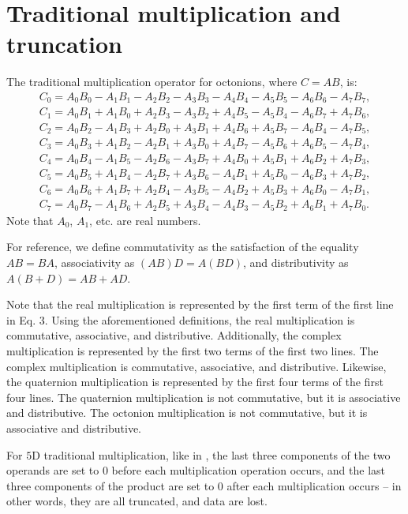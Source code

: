 \documentclass[12pt]{article}
\begin{document}
\section{Traditional multiplication and truncation}

The traditional multiplication operator for octonions, where $C = AB$, is:
\begin{equation}
\begin{split}
C_0 = A_0 B_0 - A_1 B_1 - A_2 B_2 - A_3 B_3 - A_4 B_4 - A_5 B_5 - A_6 B_6 - A_7 B_7, \\
C_1 = A_0 B_1 + A_1 B_0 + A_2 B_3 - A_3 B_2 + A_4 B_5 - A_5 B_4 - A_6 B_7 + A_7 B_6, \\
C_2 = A_0 B_2 - A_1 B_3 + A_2 B_0 + A_3 B_1 + A_4 B_6 + A_5 B_7 - A_6 B_4 - A_7 B_5, \\
C_3 = A_0 B_3 + A_1 B_2 - A_2 B_1 + A_3 B_0 + A_4 B_7 - A_5 B_6 + A_6 B_5 - A_7 B_4, \\
C_4 = A_0 B_4 - A_1 B_5 - A_2 B_6 - A_3 B_7 + A_4 B_0 + A_5 B_1 + A_6 B_2 + A_7 B_3, \\
C_5 = A_0 B_5 + A_1 B_4 - A_2 B_7 + A_3 B_6 - A_4 B_1 + A_5 B_0 - A_6 B_3 + A_7 B_2, \\
C_6 = A_0 B_6 + A_1 B_7 + A_2 B_4 - A_3 B_5 - A_4 B_2 + A_5 B_3 + A_6 B_0 - A_7 B_1, \\
C_7 = A_0 B_7 - A_1 B_6 + A_2 B_5 + A_3 B_4 - A_4 B_3 - A_5 B_2 + A_6 B_1 + A_7 B_0.
\end{split}
\end{equation}
Note that $A_0$, $A_1$, etc. are real numbers.

For reference, we define commutativity as the satisfaction of the equality $AB = BA$, associativity as $(AB)D = A(BD)$, and distributivity as $A(B + D) = AB + AD$.

Note that the real multiplication is represented by the first term of the first line in Eq. 3.
Using the aforementioned definitions, the real multiplication is commutative, associative, and distributive.
Additionally, the complex multiplication is represented by the first two terms of the first two lines.
The complex multiplication is commutative, associative, and distributive.
Likewise, the quaternion multiplication is represented by the first four terms of the first four lines.
The quaternion multiplication is not commutative, but it is associative and distributive.
The octonion multiplication is not commutative, but it is associative and distributive.

For $5$D traditional multiplication, like in \cite{wang2}, the last three components of the two operands are set to $0$ before each multiplication operation occurs, and the last three components of the product are set to $0$ after each multiplication occurs -- in other words, they are all truncated, and data are lost.
\end{document}
